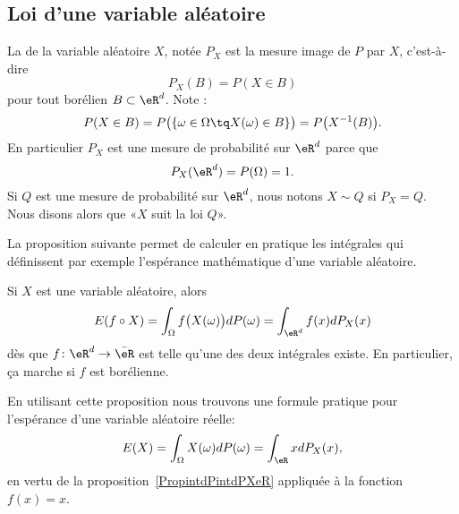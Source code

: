 \subsection{Loi d'une variable aléatoire}

La  de la variable aléatoire \( X\), notée \( P_X\) est la mesure image de \( P\) par \( X\), c'est-à-dire
\begin{equation}
	P_X(B)=P(X\in B)
\end{equation}
pour tout borélien \( B\subset\eR^d\). Note :
\begin{equation}
	P(X\in B)=P\big( \{ \omega\in\Omega\tq X(\omega)\in B \} \big)=P\big( X^{-1}(B) \big).
\end{equation}
En particulier \( P_X\) est une mesure de probabilité sur \( \eR^d\) parce que
\begin{equation}
	P_X(\eR^d)=P(\Omega)=1.
\end{equation}
Si \( Q\) est une mesure de probabilité sur \( \eR^d\), nous notons \( X\sim Q\) si \( P_X=Q\). Nous disons alors que «\( X\) suit la loi \( Q\)».

La proposition suivante permet de calculer en pratique les intégrales qui définissent par exemple l'espérance mathématique d'une variable aléatoire.
\begin{proposition}\label{PropintdPintdPXeR}
	Si \( X\) est une variable aléatoire, alors
	\begin{equation}
		E(f\circ X)=\int_{\Omega}f\big( X(\omega) \big)dP(\omega)=\int_{\eR^d}f(x)dP_X(x)
	\end{equation}
	dès que \( f\colon \eR^d\to \bar\eR\) est telle qu'une des deux intégrales existe. En particulier, ça marche si \( f\) est borélienne.
\end{proposition}


En utilisant cette proposition nous trouvons une formule pratique pour l'espérance d'une variable aléatoire réelle:
\begin{equation}
	E(X)=\int_{\Omega}X(\omega)dP(\omega)=\int_{\eR}xdP_X(x),
\end{equation}
en vertu de la proposition~\ref{PropintdPintdPXeR} appliquée à la fonction \( f(x)=x\).

